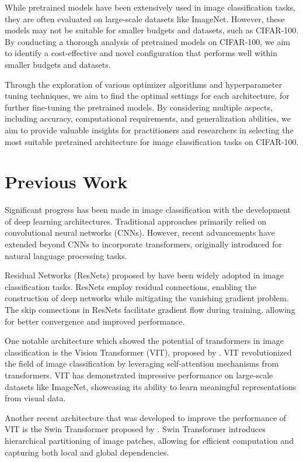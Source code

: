 \documentclass{article}
\begin{document}
While pretrained models have been extensively used in image classification tasks, they are often evaluated on large-scale datasets like ImageNet. However, these models may not be suitable for smaller budgets and datasets, such as CIFAR-100. By conducting a thorough analysis of pretrained models on CIFAR-100, we aim to identify a cost-effective and novel configuration that performs well within smaller budgets and datasets.


Through the exploration of various optimizer algorithms and hyperparameter tuning techniques, we aim to find the optimal settings for each architecture,
for further fine-tuning the pretrained models.
By considering multiple aspects, including accuracy, computational requirements, and generalization abilities, we aim to provide valuable insights for practitioners and researchers in selecting the most suitable pretrained architecture for image classification tasks on CIFAR-100.

\section{Previous Work}
Significant progress has been made in image classification with the development of deep learning architectures. Traditional approaches primarily relied on convolutional neural networks (CNNs). However, recent advancements have extended beyond CNNs to incorporate transformers, originally introduced for natural language processing tasks.

Residual Networks (ResNets) proposed by \cite{he2016deep} have been widely adopted in image classification tasks. ResNets employ residual connections, enabling the construction of deep networks while mitigating the vanishing gradient problem. The skip connections in ResNets facilitate gradient flow during training, allowing for better convergence and improved performance.

One notable architecture which showed the potential of transformers in image classification is the Vision Transformer (VIT), proposed by \cite{DBLP:journals/corr/abs-2010-11929}.
VIT revolutionized the field of image classification by leveraging self-attention mechanisms from transformers.
VIT has demonstrated impressive performance on large-scale datasets like ImageNet, showcasing its ability to learn meaningful representations from visual data.


Another recent architecture that was developed to improve the performance of VIT is the Swin Transformer proposed by \cite{DBLP:journals/corr/abs-2103-14030}.
Swin Transformer introduces hierarchical partitioning of image patches, allowing for efficient computation and capturing both local and global dependencies.
\end{document}
